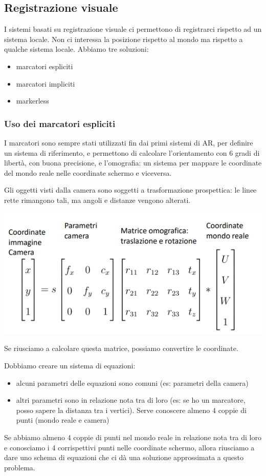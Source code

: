 \subsection{Registrazione visuale}
I sistemi basati su registrazione visuale ci permettono di registrarci rispetto ad un sistema locale. 
Non ci interessa la posizione rispetto al mondo ma rispetto a qualche sistema locale. 
Abbiamo tre soluzioni:
\begin{itemize}
    \item marcatori espliciti
    \item marcatori impliciti
    \item markerless
\end{itemize}

\subsubsection{Uso dei marcatori espliciti}
I marcatori sono sempre stati utilizzati fin dai primi sistemi di AR, per definire un sistema di riferimento, e permettono di calcolare l'orientamento con 6 gradi di libertà, con buona precisione, e l'omografia: un sistema per mappare le coordinate del mondo reale nelle coordinate schermo e viceversa. 

Gli oggetti visti dalla camera sono soggetti a trasformazione prospettica: le linee rette rimangono tali, ma angoli e distanze vengono alterati.

\begin{center}
    \includegraphics[width=.8\textwidth]{images/MobiDEV/3. augmented reality/matrice omografica.PNG}
\end{center}
Se riusciamo a calcolare questa matrice, possiamo convertire le coordinate. 

Dobbiamo creare un sistema di equazioni: 
\begin{itemize}
    \item alcuni parametri delle equazioni sono comuni (es: parametri della camera) 
    \item altri parametri sono in relazione nota tra di loro (es: se ho un marcatore, posso sapere la distanza tra i vertici). Serve conoscere almeno 4 coppie di punti (mondo reale e camera)
\end{itemize}
Se abbiamo almeno 4 coppie di punti nel mondo reale in relazione nota tra di loro e conosciamo i 4 corrispettivi punti nelle coordinate schermo, allora riusciamo a dare uno schema di equazioni che ci dà una soluzione approssimata a questo problema.

